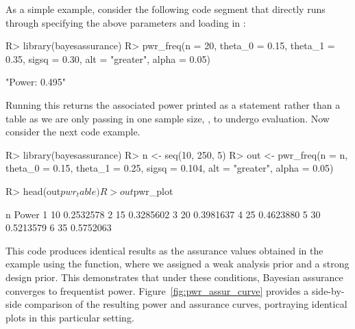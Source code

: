As a simple example, consider the following code segment
that directly runs  through specifying
the above parameters and loading in : 
\begin{Schunk}
\begin{Sin}

R> library(bayesassurance)
R> pwr_freq(n = 20, theta_0 = 0.15, theta_1 = 0.35, sigsq = 0.30, 
		alt = "greater", alpha = 0.05)

\end{Sin}
\end{Schunk}
\begin{Sout}
"Power: 0.495"
\end{Sout}
Running this returns the associated power printed
as a statement rather than a table as we are only passing in one 
sample size, , to undergo evaluation. Now consider the next 
code example.
\begin{Schunk}
\begin{Sin}

R> library(bayesassurance)
R> n <- seq(10, 250, 5)
R> out <- pwr_freq(n = n, theta_0 = 0.15, theta_1 = 0.25, sigsq = 0.104, 
        alt = "greater", alpha = 0.05)

R> head(out$pwr_table)
R> out$pwr_plot

\end{Sin}
\begin{Sout}
     n     Power
1   10 0.2532578
2   15 0.3285602
3   20 0.3981637
4   25 0.4623880
5   30 0.5213579
6   35 0.5752063
\end{Sout}
\end{Schunk}
This code produces identical results as the
assurance values obtained in the example using 
the  function, where we assigned
a weak analysis prior and a strong design prior. 
This demonstrates that under these conditions, Bayesian assurance 
converges to frequentist power. Figure~\ref{fig:pwr_assur_curve} provides
a side-by-side comparison of the resulting power and assurance curves, 
portraying identical plots in this particular setting. 


